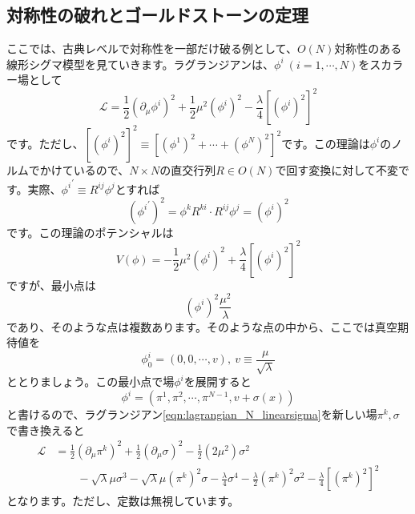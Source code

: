 \documentclass[unicode,a4paper,11pt]{ltjsarticle}
\theoremstyle{definition}
\begin{document}
\subsection{対称性の破れとゴールドストーンの定理}

ここでは、古典レベルで対称性を一部だけ破る例として、$O(N)$対称性のある線形シグマ模型を見ていきます。ラグランジアンは、$\phi^{i}\ (i=1,\cdots,N)$をスカラー場として
\begin{equation}
   \mathcal{L}
   =
   \frac{1}{2}(\partial_{\mu}\phi^{i})^2
   +
   \frac{1}{2}\mu^2(\phi^{i})^2
   -
   \frac{\lambda}{4}[(\phi^{i})^2]^2
   \label{eqn:lagrangian_N_linearsigma}
\end{equation}
です。ただし、$[(\phi^{i})^2]^2\equiv [(\phi^{1})^2+\cdots+(\phi^{N})^2]^2$です。この理論は$\phi^{i}$のノルムでかけているので、$N\times N$の直交行列$R\in O(N)$で回す変換に対して不変です。実際、${\phi^{i}}^{\prime}\equiv R^{ij}\phi^{j}$とすれば
\begin{equation}
   ({\phi^{i}}^{\prime})^2
   =
   \phi^{k}R^{ki}\cdot R^{ij}\phi^{j}
   =
   (\phi^{i})^2
\end{equation}
です。この理論のポテンシャルは
\begin{equation}
   V(\phi)
   =
   -\frac{1}{2}\mu^2 (\phi^{i})^2+\frac{\lambda}{4}[(\phi^{i})^2]^2
\end{equation}
ですが、最小点は
\begin{equation}
   (\phi^{i})^2
   \frac{\mu^2}{\lambda}
\end{equation}
であり、そのような点は複数あります。そのような点の中から、ここでは真空期待値を
\begin{equation}
   \phi_{0}^{i}
   =
   (0,0,\cdots,v)
   ,\
   v\equiv\frac{\mu}{\sqrt{\lambda}}
\end{equation}
ととりましょう。この最小点で場$\phi^{i}$を展開すると
\begin{equation}
   \phi^{i}
   =
   (\pi^{1},\pi^{2},\cdots,\pi^{N-1},v+\sigma(x))
\end{equation}
と書けるので、ラグランジアン\eqref{eqn:lagrangian_N_linearsigma}を新しい場$\pi^{k},\sigma$で書き換えると
\begin{align}
   \mathcal{L}
    & =
   \frac{1}{2}(\partial_{\mu}\pi^{k})^2
   +
   \frac{1}{2}(\partial_{\mu}\sigma)^2
   -
   \frac{1}{2}(2\mu^2)\sigma^2
   \nonumber
   \\
    & \qquad
   -\sqrt{\lambda}\mu\sigma^3
   -\sqrt{\lambda}\mu(\pi^{k})^2\sigma
   -\frac{\lambda}{4}\sigma^4
   -\frac{\lambda}{2}(\pi^{k})^2\sigma^2
   -\frac{\lambda}{4}[(\pi^{k})^2]^2
   \label{eqn:lagrangian_N_linearsigma_2}
\end{align}
となります。ただし、定数は無視しています。
\end{document}
